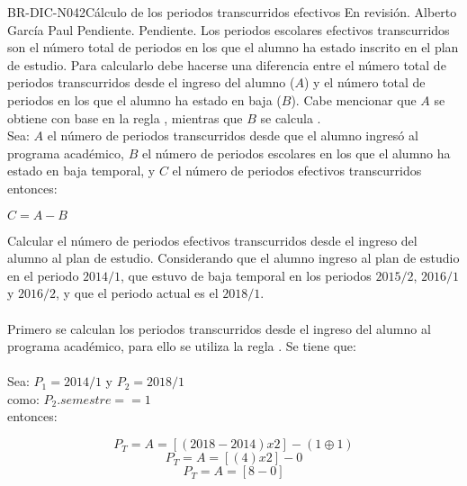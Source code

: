 \begin{BusinessRule}{BR-DIC-N042}{Cálculo de los periodos transcurridos efectivos}
	{\bcCondition} %
	{\btTimer}     %
	{\blInfluencing}     %
	\BRItem[Estado] En revisión.
	  Alberto García Paul
	 Pendiente.
	 Pendiente.
	\BRItem[Descripción] Los periodos escolares efectivos transcurridos son el número total de periodos en los que el alumno ha estado inscrito en el plan de estudio. Para calcularlo debe hacerse una diferencia entre el número total de periodos transcurridos desde el ingreso del alumno ($A$) y el número total de periodos en los que el alumno ha estado en baja ($B$). Cabe mencionar que $A$ se obtiene con base en la regla , mientras que $B$ se calcula .  \\
	\BRItem[Sentencia] \cdtEmpty
	Sea: $A$ el número de periodos transcurridos desde que el alumno ingresó al programa académico, $B$ el número de periodos escolares en los que el alumno ha estado en baja temporal, y $C$ el número de periodos efectivos transcurridos \\ 
	entonces:
	\begin{center}
		$C = A - B$
	\end{center}
	\BRItem[Motivación] Calcular el número de periodos efectivos transcurridos desde el ingreso del alumno al plan de estudio.
	\BRItem[Ejemplo 1] Considerando que el alumno ingreso al plan de estudio en el periodo $2014/1$, que estuvo de baja temporal en los periodos $2015/2$, $2016/1$ y $2016/2$, y que el periodo actual es el $2018/1$. \\ \\ 
	Primero se calculan los periodos transcurridos desde el ingreso del alumno al programa académico, para ello se utiliza la regla . Se tiene que: \\ \\
	Sea: $P_{1} = 2014/1$ y $P_{2} = 2018/1$ \\
	como: $P_{2}.semestre == 1$ \\
	entonces: 
	\begin{center}
		\[P_{T} = A = [(2018 - 2014) x 2] - (1 \oplus 1)\] 
		\[P_{T} = A = [(4) x 2] - 0\] 
		\[P_{T} = A = [8 - 0]\] 

\end{center}
\end{BusinessRule}
